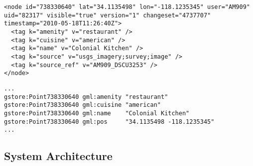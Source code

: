 


\begin{lstlisting}[caption={An XML data excerpt from the OpenStreetMap project.}, label={list2}]
<node id="738330640" lat="34.1135498" lon="-118.1235345" user="AM909" uid="82317" visible="true" version="1" changeset="4737707" timestamp="2010-05-18T11:26:40Z">
  <tag k="amenity" v="restaurant" />
  <tag k="cuisine" v="american" />
  <tag k="name" v="Colonial Kitchen" />
  <tag k="source" v="usgs_imagery;survey;image" />
  <tag k="source_ref" v="AM909_DSCU3253" />
</node>
\end{lstlisting}


\begin{lstlisting}[caption={The RDF representation of the restaurant described in Listing~\ref{list2}.}, label={list3}]
...
gstore:Point738330640 gml:amenity "restaurant"
gstore:Point738330640 gml:cuisine "american"
gstore:Point738330640 gml:name    "Colonial Kitchen"
gstore:Point738330640 gml:pos     "34.1135498 -118.1235345"
...
\end{lstlisting}


\subsection{System Architecture}

